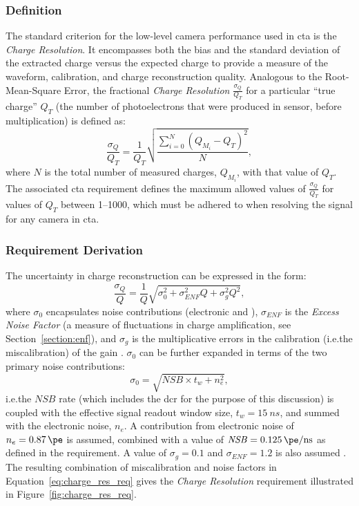 \subsubsection{Definition}

The standard criterion for the low-level camera performance used in \gls{cta} is the \textit{Charge Resolution}. It encompasses both the bias and the standard deviation of the extracted charge versus the expected charge to provide a measure of the waveform, calibration, and charge reconstruction quality. Analogous to the Root-Mean-Square Error, the fractional \textit{Charge Resolution} $\frac{\sigma_Q}{Q_T}$ for a particular ``true charge'' $Q_T$ (the number of photoelectrons that were produced in sensor, before multiplication) is defined as:
\begin{equation} \label{eq:charge_res}
\frac{\sigma_Q}{Q_T} = \frac{1}{Q_T} \sqrt{\frac{\sum_{i=0}^N (Q_{M_i} - Q_T)^2}{N}},
\end{equation}
where $N$ is the total number of measured charges, $Q_{M_i}$, with that value of $Q_T$. The associated \gls{cta} requirement defines the maximum allowed values of $\frac{\sigma_Q}{Q_T}$ for values of $Q_T$ between \SIrange{1}{1000}{\pe}, which must be adhered to when resolving the signal for any camera in \gls{cta}.

\subsubsection{Requirement Derivation}

The uncertainty in charge reconstruction can be expressed in the form:
\begin{equation} \label{eq:charge_res_req}
\frac{\sigma_Q}{Q} = \frac{1}{Q} \sqrt{\sigma_0^2 + \sigma_{ENF}^2 Q + \sigma_g^2 Q^2},
\end{equation}
where $\sigma_0$ encapsulates noise contributions (electronic and ), $\sigma_{ENF}$ is the \textit{Excess Noise Factor} (a measure of fluctuations in charge amplification, see Section~\ref{section:enf}), and $\sigma_g$ is the multiplicative errors in the calibration (i.e.\@ the miscalibration) of the gain \cite{petophotons}\cite{Ohm2012}. $\sigma_0$ can be further expanded in terms of the two primary noise contributions:
\begin{equation} \label{eq:charge_res_nsb}
\sigma_0 = \sqrt{\mathit{NSB} \times t_w + n_e^2},
\end{equation}
i.e.\@ the $\mathit{NSB}$ rate (which includes the \gls{dcr} for the purpose of this discussion) is coupled with the effective signal readout window size, $t_w = \SI{15}{ns}$, and summed with the electronic noise, $n_e$. A contribution from electronic noise of $n_e = \SI{0.87}{\pe}$ is assumed, combined with a value of $\mathit{NSB} = \SI{0.125}{\pe/ns}$ as defined in the requirement. A value of $\sigma_g = 0.1$ and $\sigma_{ENF} = 1.2$ is also assumed \cite{petophotons}. The resulting combination of miscalibration and noise factors in Equation~\ref{eq:charge_res_req} gives the \textit{Charge Resolution} requirement illustrated in Figure~\ref{fig:charge_res_req}.

